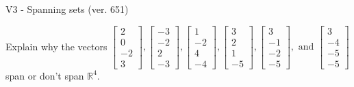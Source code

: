 \begin{exercise}
  \begin{exerciseTitle}V3 - Spanning sets (ver. 651)\end{exerciseTitle}
  \begin{exerciseStatement}
    Explain why the vectors \(\left[\begin{array}{r}
2 \\
0 \\
-2 \\
3
\end{array}\right] , \left[\begin{array}{r}
-3 \\
-2 \\
2 \\
-3
\end{array}\right] , \left[\begin{array}{r}
1 \\
-2 \\
4 \\
-4
\end{array}\right] , \left[\begin{array}{r}
3 \\
2 \\
1 \\
-5
\end{array}\right] , \left[\begin{array}{r}
3 \\
-1 \\
-2 \\
-5
\end{array}\right] , \text{ and } \left[\begin{array}{r}
3 \\
-4 \\
-5 \\
-5
\end{array}\right]\) span or don't span \(\mathbb{R}^4\). 
	



\end{exerciseStatement}
\end{exercise}
